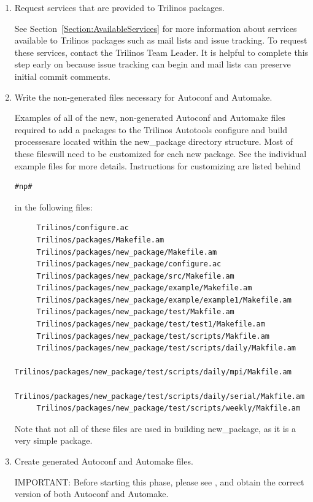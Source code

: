 \documentclass[12pt,strict]{TrilinosDevGuide}
\begin{document}
\begin{enumerate}

\item Request services that are provided to Trilinos packages.

See Section~\ref{Section:AvailableServices} for more information about 
services available to Trilinos packages such as mail lists and issue 
tracking.  To request these services, contact the Trilinos Team Leader.  
It is helpful to complete this step early on because issue tracking can 
begin and mail lists can preserve initial commit comments.

\item Write the non-generated files necessary for Autoconf and Automake.

Examples of all of the new, non-generated Autoconf and Automake files
required to add a packages to the Trilinos Autotools configure and build 
processesare located within the new\_package directory structure.  Most of 
these fileswill need to be customized for each new package.  See the 
individual example files for more details.  Instructions for customizing are 
listed behind 
\begin{verbatim}
#np# 
\end{verbatim}
in the following files:
\begin{verbatim}
     Trilinos/configure.ac
     Trilinos/packages/Makefile.am
     Trilinos/packages/new_package/Makefile.am
     Trilinos/packages/new_package/configure.ac  
     Trilinos/packages/new_package/src/Makefile.am
     Trilinos/packages/new_package/example/Makefile.am
     Trilinos/packages/new_package/example/example1/Makefile.am
     Trilinos/packages/new_package/test/Makfile.am
     Trilinos/packages/new_package/test/test1/Makefile.am
     Trilinos/packages/new_package/test/scripts/Makfile.am
     Trilinos/packages/new_package/test/scripts/daily/Makfile.am
     Trilinos/packages/new_package/test/scripts/daily/mpi/Makfile.am
     Trilinos/packages/new_package/test/scripts/daily/serial/Makfile.am
     Trilinos/packages/new_package/test/scripts/weekly/Makfile.am
\end{verbatim}

Note that not all of these files are used in building new\_package, as it is 
a very simple package.

\item Create generated Autoconf and Automake files.

IMPORTANT: Before starting this phase, please see \newline
{}, and obtain the correct 
version of both Autoconf and Automake.


\end{enumerate}
\end{document}
